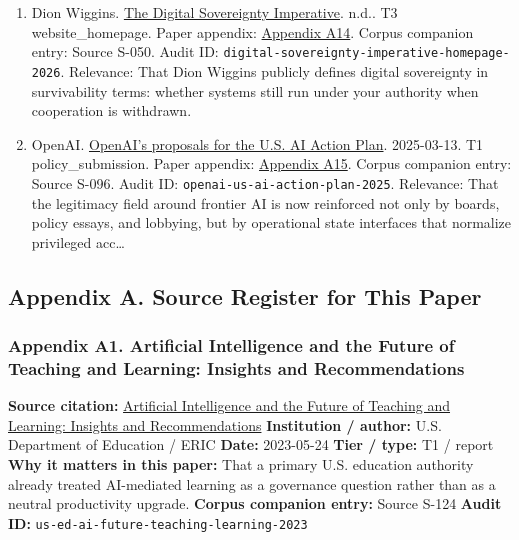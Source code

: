 \documentclass[
  american,
  11pt,
  letterpaper,
]{article}
\begin{document}
\begin{enumerate}
{  Zuckerberg's Message to Meta Employees}. 2023-03-14. T1
  company\_statement. Paper appendix:
  \hyperref[appendix-a13-mark-zuckerberg-s-message-to-meta-employees]{Appendix
  A13}. Corpus companion entry: Source S-082. Audit ID:
  \texttt{meta-year-of-efficiency-2023}. Relevance: Supports a key
  factual or interpretive move inside this paper.
\item
  Dion Wiggins. \href{https://digitalsovereigntyimperative.com/}{The
  Digital Sovereignty Imperative}. n.d.. T3 website\_homepage. Paper
  appendix:
  \hyperref[appendix-a14-the-digital-sovereignty-imperative]{Appendix
  A14}. Corpus companion entry: Source S-050. Audit ID:
  \texttt{digital-sovereignty-imperative-homepage-2026}. Relevance: That
  Dion Wiggins publicly defines digital sovereignty in survivability
  terms: whether systems still run under your authority when cooperation
  is withdrawn.
\item
  OpenAI.
  \href{https://openai.com/global-affairs/openai-proposals-for-the-us-ai-action-plan/}{OpenAI's
  proposals for the U.S. AI Action Plan}. 2025-03-13. T1
  policy\_submission. Paper appendix:
  \hyperref[appendix-a15-openais-proposals-for-the-us-ai-action-plan]{Appendix
  A15}. Corpus companion entry: Source S-096. Audit ID:
  \texttt{openai-us-ai-action-plan-2025}. Relevance: That the legitimacy
  field around frontier AI is now reinforced not only by boards, policy
  essays, and lobbying, but by operational state interfaces that
  normalize privileged acc\ldots{}
\end{enumerate}

\subsection{Appendix A. Source Register for This
Paper}\label{appendix-a.-source-register-for-this-paper}

\subsubsection{Appendix A1. Artificial Intelligence and the Future of
Teaching and Learning: Insights and
Recommendations}\label{appendix-a1-artificial-intelligence-and-the-future-of-teaching-and-learning-insights-and-recommendations}

\textbf{Source citation:}
\href{https://eric.ed.gov/?id=ED631097}{Artificial Intelligence and the
Future of Teaching and Learning: Insights and Recommendations}
\textbf{Institution / author:} U.S. Department of Education / ERIC
\textbf{Date:} 2023-05-24 \textbf{Tier / type:} T1 / report \textbf{Why
it matters in this paper:} That a primary U.S. education authority
already treated AI-mediated learning as a governance question rather
than as a neutral productivity upgrade. \textbf{Corpus companion entry:}
Source S-124 \textbf{Audit ID:}
\texttt{us-ed-ai-future-teaching-learning-2023}
\end{document}
